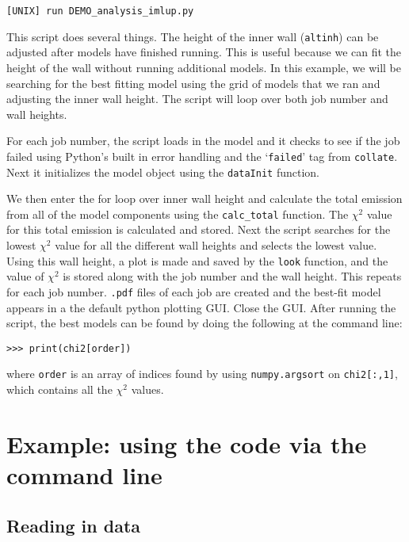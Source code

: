 \documentclass{article}
\begin{document}
\vspace{2mm}
\texttt{[UNIX] run DEMO\_analysis\_imlup.py}
\vspace{2mm}

This script does several things.  The height of the inner wall (\texttt{altinh}) can be adjusted after models have finished running. This is useful because we can fit the height of the wall without running additional models. 
In this example, we will be searching for the best fitting model using the grid of models that we ran and adjusting the inner wall height. The script will loop over both job number and wall heights.

For each job number, the script loads in the model and it checks to see if the job failed using Python's built in error handling and the `\texttt{failed}' tag from \texttt{collate}. 
Next it initializes the model object using the \texttt{dataInit} function. 

We then enter the for loop over inner wall height and calculate the total emission from all of the model components using the \texttt{calc\_total} function. The $\chi^2$ value for this total emission is calculated and stored. Next the script searches for the lowest $\chi^2$ value for all the different wall heights and selects the lowest value. Using this wall height, a plot is made and saved by the \texttt{look} function, and the value of $\chi^2$ is stored along with the job number and the wall height. This repeats for each job number. \texttt{.pdf} files of each job are created and the best-fit model appears in a the default python plotting GUI. Close the GUI. After running the script, the best models can be found by doing the following at the command line:

\vspace{2mm}
\texttt{>>> print(chi2[order])}
\vspace{2mm}

where \texttt{order} is an array of indices found by using \texttt{numpy.argsort} on \texttt{chi2[:,1]}, which contains all the $\chi^2$ values. 

\section{Example: using the code via the command line} \label{commandline}

\subsection{Reading in data}
\end{document}
